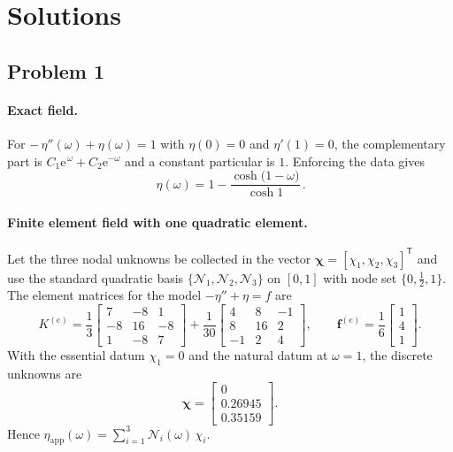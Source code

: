 \newpage
\section*{Solutions}

\subsection*{Problem 1}
\paragraph{Exact field.}
For
\(
−\,\eta''(\omega)+\eta(\omega)=1
\)
with \(\eta(0)=0\) and \(\eta'(1)=0\), the complementary part is \(C_1 \mathrm e^{\,\omega}+C_2 \mathrm e^{−\omega}\) and a constant particular is \(1\). Enforcing the data gives
\[
\boxed{\,\eta(\omega)=1−\dfrac{\cosh\!\big(1−\omega\big)}{\cosh 1}\, }.
\]

\paragraph{Finite element field with one quadratic element.}
Let the three nodal unknowns be collected in the vector \(\boldsymbol{\chi}=[\chi_1,\chi_2,\chi_3]^{\mathsf T}\) and use the standard quadratic basis \(\{\mathcal N_1,\mathcal N_2,\mathcal N_3\}\) on \([0,1]\) with node set \(\{0,\tfrac12,1\}\). The element matrices for the model \(−\eta''+\eta=f\) are
\[
K^{(e)}=\frac{1}{3}
\begin{bmatrix}
7&−8&1\\
−8&16&−8\\
1&−8&7
\end{bmatrix}
+\frac{1}{30}
\begin{bmatrix}
4&8&−1\\
8&16&2\\
−1&2&4
\end{bmatrix},
\qquad
\boldsymbol{f}^{(e)}=\frac{1}{6}\begin{bmatrix}1\\4\\1\end{bmatrix}.
\]
With the essential datum \(\chi_1=0\) and the natural datum at \(\omega=1\), the discrete unknowns are
\[
\boldsymbol{\chi}=
\begin{bmatrix}
0\\[2pt]
0.26945\\[2pt]
0.35159
\end{bmatrix}.
\]
Hence
\(
\eta_{\mathrm{app}}(\omega)=\sum_{i=1}^{3}\mathcal N_i(\omega)\,\chi_i
\).


